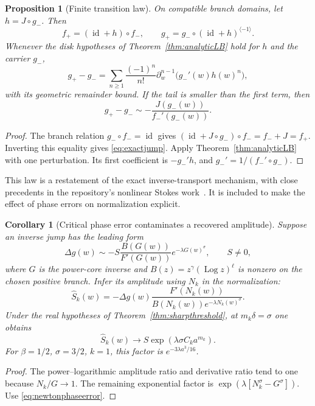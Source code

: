 \documentclass[11pt,a4paper]{article}
\newtheorem{proposition}[theorem]{Proposition}
\newtheorem{corollary}[theorem]{Corollary}
\theoremstyle{definition}
\theoremstyle{remark}
\newcommand{\Log}{\operatorname{Log}}
\newcommand{\id}{\operatorname{id}}
\newcommand{\rev}{^{\langle-1\rangle}}
\numberwithin{equation}{section}
\begin{document}
\begin{proposition}[Finite transition law]\label{prop:jump}
On compatible branch domains, let $h=J\circ g_-$. Then
\begin{equation}\label{eq:exactjump}
 f_+=(\id+h)\circ f_-,\qquad
 g_+=g_-\circ(\id+h)\rev.
\end{equation}
Whenever the disk hypotheses of Theorem~\ref{thm:analyticLB} hold for $h$ and the carrier $g_-$,
\begin{equation}\label{eq:jumpseries}
 g_+-g_-=
 \sum_{n\ge1}\frac{(-1)^n}{n!}
 \partial_w^{n-1}\bigl(g_-'(w)h(w)^n\bigr),
\end{equation}
with its geometric remainder bound. If the tail is smaller than the first term, then
\begin{equation}\label{eq:firstjump}
 g_+-g_-\sim-\frac{J(g_-(w))}{f_-'(g_-(w))}.
\end{equation}
\end{proposition}
\begin{proof}
The branch relation $g_-\circ f_-=\id$ gives
$(\id+J\circ g_-)\circ f_-=f_-+J=f_+$. Inverting this equality gives \eqref{eq:exactjump}. Apply Theorem~\ref{thm:analyticLB} with one perturbation. Its first coefficient is $-g_-'h$, and $g_-'=1/(f_-'\circ g_-)$.
\end{proof}

This law is a restatement of the exact inverse-transport mechanism, with close precedents in the repository's nonlinear Stokes work~\cite{RepoStokes}. It is included to make the effect of phase errors on normalization explicit.

\begin{corollary}[Critical phase error contaminates a recovered amplitude]\label{cor:stokesbias}
Suppose an inverse jump has the leading form
\[
 \Delta g(w)\sim-S\frac{B(G(w))}{F'(G(w))}e^{-\lambda G(w)^\sigma},
 \qquad S\ne0,
\]
where $G$ is the power-core inverse and $B(z)=z^\gamma(\Log z)^\ell$ is nonzero on the chosen positive branch. Infer its amplitude using $N_k$ in the normalization:
\[
 \widehat S_k(w)=
 -\Delta g(w)\frac{F'(N_k(w))}{B(N_k(w))e^{-\lambda N_k(w)^\sigma}}.
\]
Under the real hypotheses of Theorem~\ref{thm:sharpthreshold}, at $m_k\delta=\sigma$ one obtains
\begin{equation}\label{eq:amplitudebias}
 \widehat S_k(w)\longrightarrow S\exp(\lambda\sigma C_k a^{m_k}).
\end{equation}
For $\beta=1/2$, $\sigma=3/2$, $k=1$, this factor is $e^{-3\lambda a^3/16}$.
\end{corollary}
\begin{proof}
The power--logarithmic amplitude ratio and derivative ratio tend to one because $N_k/G\to1$. The remaining exponential factor is $\exp(\lambda[N_k^\sigma-G^\sigma])$. Use \eqref{eq:newtonphaseerror}.
\end{proof}
\end{document}
